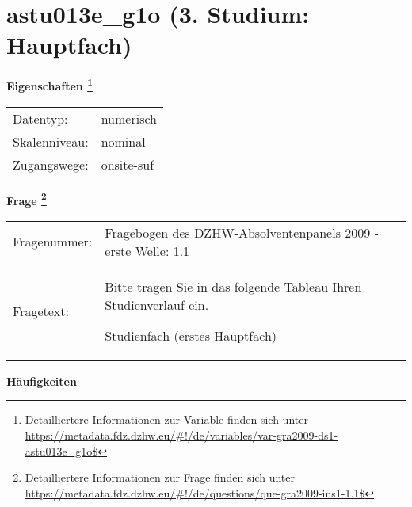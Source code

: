 
    \setcounter{footnote}{0}

    \vspace*{-1.8cm}
	\section{astu013e\_g1o (3. Studium: Hauptfach)}
	\label{section:astu013e_g1o}



    \vspace*{0.5cm}
    \noindent\textbf{Eigenschaften
	\footnote{Detailliertere Informationen zur Variable finden sich unter
		\url{https://metadata.fdz.dzhw.eu/\#!/de/variables/var-gra2009-ds1-astu013e_g1o$}}}\\
	\begin{tabularx}{\hsize}{@{}lX}
	Datentyp: & numerisch \\
	Skalenniveau: & nominal \\
	Zugangswege: &
	  onsite-suf
 \\
    \end{tabularx}



				\vspace*{0.5cm}
                \noindent\textbf{Frage
	                \footnote{Detailliertere Informationen zur Frage finden sich unter
		              \url{https://metadata.fdz.dzhw.eu/\#!/de/questions/que-gra2009-ins1-1.1$}}}\\
				\begin{tabularx}{\hsize}{@{}lX}
					Fragenummer: &
					  Fragebogen des DZHW-Absolventenpanels 2009 - erste Welle:
					  1.1
 \\
					Fragetext: & Bitte tragen Sie in das folgende Tableau Ihren Studienverlauf ein.\par  Studienfach (erstes Hauptfach) \\
				\end{tabularx}





        		\vspace*{0.5cm}
                \noindent\textbf{Häufigkeiten}


